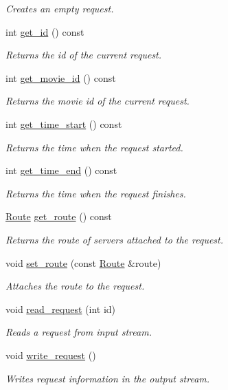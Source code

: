 \begin{DoxyCompactItemize}
\begin{DoxyCompactList}\small\item\em Creates an empty request. \end{DoxyCompactList}\item 
int \hyperlink{class_request_a599ad8f23ad88cc996e3ed9b4f30d9dd}{get\-\_\-id} () const 
\begin{DoxyCompactList}\small\item\em Returns the id of the current request. \end{DoxyCompactList}\item 
int \hyperlink{class_request_aa3bd5944619ff25280f9415527cbba49}{get\-\_\-movie\-\_\-id} () const 
\begin{DoxyCompactList}\small\item\em Returns the movie id of the current request. \end{DoxyCompactList}\item 
int \hyperlink{class_request_ae4fd464df15930c0eefaf58532bc798c}{get\-\_\-time\-\_\-start} () const 
\begin{DoxyCompactList}\small\item\em Returns the time when the request started. \end{DoxyCompactList}\item 
int \hyperlink{class_request_a227ed7fcfb0cb2be9f1867da75c1bca2}{get\-\_\-time\-\_\-end} () const 
\begin{DoxyCompactList}\small\item\em Returns the time when the request finishes. \end{DoxyCompactList}\item 
\hyperlink{class_route}{Route} \hyperlink{class_request_aeb33aab0cad4e8a31dae47ec2835d88a}{get\-\_\-route} () const 
\begin{DoxyCompactList}\small\item\em Returns the route of servers attached to the request. \end{DoxyCompactList}\item 
void \hyperlink{class_request_a13116660438837d356978f3732be1fc6}{set\-\_\-route} (const \hyperlink{class_route}{Route} \&route)
\begin{DoxyCompactList}\small\item\em Attaches the route to the request. \end{DoxyCompactList}\item 
void \hyperlink{class_request_a8dbd0625831bd993f8ab038bbad11c0c}{read\-\_\-request} (int id)
\begin{DoxyCompactList}\small\item\em Reads a request from input stream. \end{DoxyCompactList}\item 
void \hyperlink{class_request_ac3648ea8be667941c55018428cf469ed}{write\-\_\-request} ()
\begin{DoxyCompactList}\small\item\em Writes request information in the output stream. \end{DoxyCompactList}\end{DoxyCompactItemize}


